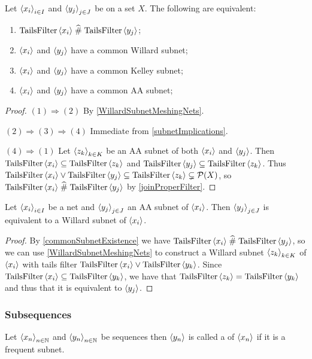 \begin{proposition} \label{commonSubnetExistence}
Let $\seq{x_i}_{i\in I}$ and $\seq{y_j}_{j\in J}$ be on a set $X$. The following are equivalent:
\begin{enumerate}
\item $\TailsFilter\seq{x_i} \amesh \TailsFilter\seq{y_j}$;
\item $\seq{x_i}$ and $\seq{y_j}$ have a common Willard subnet;
\item $\seq{x_i}$ and $\seq{y_j}$ have a common Kelley subnet;
\item $\seq{x_i}$ and $\seq{y_j}$ have a common AA subnet;
\end{enumerate}
\end{proposition}
\begin{proof}
$(1) \Rightarrow (2)$ By \ref{WillardSubnetMeshingNets}.

$(2) \Rightarrow (3) \Rightarrow (4)$ Immediate from \ref{subnetImplications}.

$(4) \Rightarrow (1)$ Let $\seq{z_k}_{k\in K}$ be an AA subnet of both $\seq{x_i}$ and $\seq{y_j}$. Then $\TailsFilter\seq{x_i} \subseteq \TailsFilter\seq{z_k}$ and $\TailsFilter\seq{y_j} \subseteq \TailsFilter\seq{z_k}$. Thus $\TailsFilter\seq{x_i}\vee \TailsFilter\seq{y_j} \subseteq \TailsFilter\seq{z_k} \subsetneq \powerset(X)$, so $\TailsFilter\seq{x_i} \amesh \TailsFilter\seq{y_j}$ by \ref{joinProperFilter}.
\end{proof}

\begin{proposition}
Let $\seq{x_i}_{i\in I}$ be a net and $\seq{y_j}_{j\in J}$ an AA subnet of $\seq{x_i}$. Then $\seq{y_j}_{j\in J}$ is equivalent to a Willard subnet of $\seq{x_i}$.
\end{proposition}
\begin{proof}
By \ref{commonSubnetExistence} we have $\TailsFilter\seq{x_i} \amesh \TailsFilter\seq{y_j}$, so we can use \ref{WillardSubnetMeshingNets} to construct a Willard subnet $\seq{z_k}_{k\in K}$ of $\seq{x_i}$ with tails filter $\TailsFilter\seq{x_i}\vee \TailsFilter\seq{y_k}$. Since $\TailsFilter\seq{x_i}\subseteq \TailsFilter\seq{y_k}$, we have that $\TailsFilter\seq{z_k} = \TailsFilter\seq{y_k}$ and thus that it is equivalent to $\seq{y_j}$.
\end{proof}

\subsubsection{Subsequences}
\begin{definition}
Let $\seq{x_n}_{n\in \N}$ and $\seq{y_n}_{n\in \N}$ be sequences then $\seq{y_n}$ is called a  of $\seq{x_n}$ if it is a frequent subnet. 
\end{definition}

